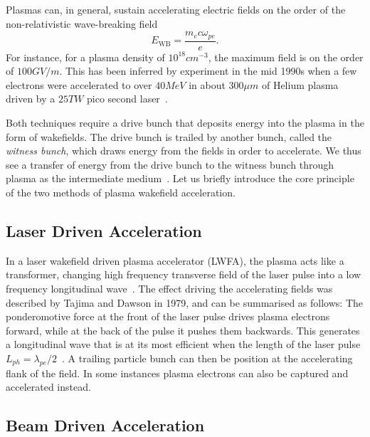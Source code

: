 Plasmas can, in general, sustain accelerating electric fields on the order of the non-relativistic wave-breaking field~\cite{dawson:1959, esarey:1996}
\begin{equation}
    E_{\mathrm{WB}} = \frac{m_{e} c \omega_{pe}}{e}. \label{EQ:EWB}
\end{equation}
For instance, for a plasma density of $10^{18}\unit{cm}^{-3}$, the maximum field is on the order of $100\unit{GV/m}$.
This has been inferred by experiment in the mid 1990s when a few electrons were accelerated to over $40\unit{MeV}$ in about $300\unit{\mu m}$ of Helium plasma driven by a $25\unit{TW}$ pico second laser~\cite{modena:1995}.

Both techniques require a drive bunch that deposits energy into the plasma in the form of wakefields.
The drive bunch is trailed by another bunch, called the \textit{witness bunch}, which draws energy from the fields in order to accelerate.
We thus see a transfer of energy from the drive bunch to the witness bunch through plasma as the intermediate medium~\cite{muggli:2009}.
Let us briefly introduce the core principle of the two methods of plasma wakefield acceleration. 

\subsection{Laser Driven Acceleration}
\label{Int:LWFA}

In a laser wakefield driven plasma accelerator (LWFA), the plasma acts like a transformer, changing high frequency transverse field of the laser pulse into a low frequency longitudinal wave~\cite{malka:2009}.
The effect driving the accelerating fields was described by Tajima and Dawson in 1979, and can be summarised as follows:
The ponderomotive force at the front of the laser pulse drives plasma electrons forward, while at the back of the pulse it pushes them backwards.
This generates a longitudinal wave that is at its most efficient when the length of the laser pulse $L_{ph} = \lambda_{pe}/2$~\cite{tajima:1979}.
A trailing particle bunch can then be position at the accelerating flank of the field.
In some instances plasma electrons can also be captured and accelerated instead.

\subsection{Beam Driven Acceleration}
\label{Int:BDPWFA}

